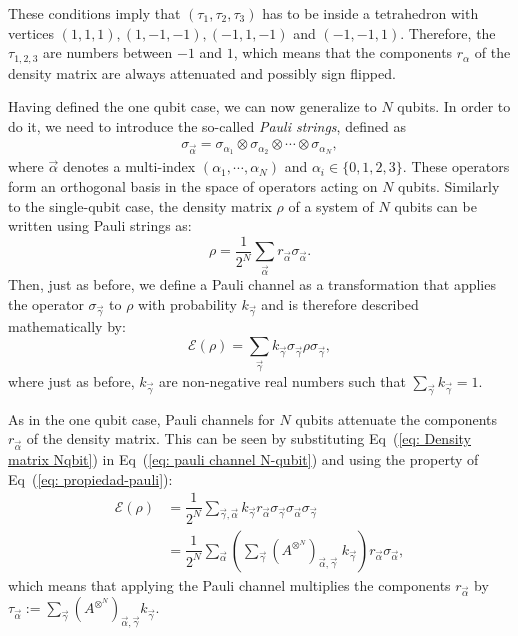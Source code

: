 \documentclass[10pt,letterpaper]{article} %
\newcommand{\eref}[1]{Eq~(\ref{#1})}
\begin{document}
These conditions imply that $(\tau_1,\tau_2,\tau_3)$
has to be inside a tetrahedron with
vertices $(1,1,1), (1,-1,-1), (-1,1,-1)$ and $(-1,-1,1)$. 
Therefore, the $\tau_{1,2,3}$ are numbers between 
$-1$ and $1$, which means that the components
$r_{\alpha}$ of the density matrix are always 
attenuated and possibly sign flipped.

Having defined the one qubit case,  we can now generalize to $N$ qubits.
In order to do it, we need to introduce the so-called \textit{Pauli strings}, defined as
\begin{eqnarray}
\label{eq: Pauli string}
\sigma_{\vec{\alpha}} = \sigma_{\alpha_1} \otimes \sigma_{\alpha_2}\otimes \cdots \otimes \sigma_{\alpha_N},
\end{eqnarray}
where $\vec{\alpha}$ denotes a multi-index $(\alpha_1, \cdots, \alpha_N)$
 and $\alpha_i \in \{0,1,2,3\}$. 
These operators form an orthogonal basis in the space of operators acting on $N$ qubits. 
 Similarly to the single-qubit case, the density matrix $\rho$ 
of a system of $N$ qubits can be written using Pauli strings as:
\begin{equation}
\label{eq:  Density matrix Nqbit}
\rho = \dfrac{1}{2^N} \sum_{\vec{\alpha}} r_{\vec{\alpha}} \sigma_{\vec{\alpha}}.
\end{equation}
Then, just as before, we define a Pauli channel as a transformation that applies 
the operator $\sigma_{\vec{\gamma}}$ to $\rho$ with probability $k_{\vec{\gamma}}$
and is therefore described mathematically by:
\begin{equation}
\label{eq: pauli channel N-qubit}
\mathcal{E}(\rho) = \sum_{\vec{\gamma}} k_{\vec{\gamma}} \sigma_{\vec{\gamma}} \rho \sigma_{\vec{\gamma}},
\end{equation}
where just as before, $k_{\vec{\gamma}}$ are non-negative real numbers such 
that $\sum_{\vec{\gamma}} k_{\vec{\gamma}}=1$.

As in the one qubit case, Pauli channels for $N$ qubits 
attenuate the components $r_{\vec{\alpha}}$ of the density matrix.
This can be seen by substituting \eref{eq:  Density matrix Nqbit} in \eref{eq: pauli channel N-qubit}
and using the property of \eref{eq: propiedad-pauli}:
\begin{align*}
\mathcal{E}(\rho) &= \dfrac{1}{2^N} \sum_{\vec{\gamma},\vec{\alpha}} k_{\vec{\gamma}} r_{\vec{\alpha}} \sigma_{\vec{\gamma}} \sigma_{\vec{\alpha}} \sigma_{\vec{\gamma}} \\
& = \dfrac{1}{2^N} \sum_{\vec{\alpha}} \left( \sum_{\vec{\gamma}} {(A^{\otimes^N})}_{\vec{\alpha},\vec{\gamma}} \; k_{\vec{\gamma}} \right) r_{\vec{\alpha}} \sigma_{\vec{\alpha}},
\end{align*}
which means that applying the Pauli channel multiplies the 
components $r_{\vec{\alpha}}$ by $\tau_{\vec{\alpha}} := \sum_{\vec{\gamma}} {(A^{\otimes^N})}_{\vec{\alpha},\vec{\gamma}} k_{\vec{\gamma}}$.
\end{document}

